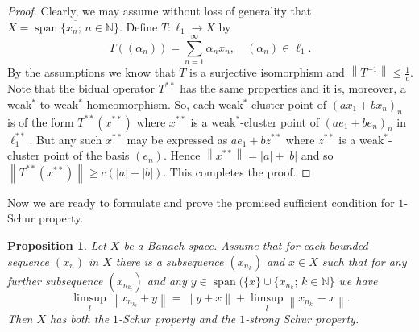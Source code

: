 \documentclass{amsart}
\numberwithin{equation}{section}
\newtheorem{prop}[thm]{Proposition}
\theoremstyle{definition}
\def\en{\mathbb N}
\def\ov{\overline}
\def\span{\operatorname{span}}
\newcommand{\norm}[1]{\left\|#1\right\|}
\newcommand{\abs}[1]{\left|#1\right|}
\newcommand{\setsep}{;\,}
\begin{document}
\begin{proof} Clearly, we may assume without loss of generality that $X=\ov{\span\{x_n\setsep n\in\en\}}$. Define $T:\ell_1\to X$ by
$$T((\alpha_n))=\sum_{n=1}^\infty \alpha_n x_n,\quad (\alpha_n)\in \ell_1.$$
By the assumptions we know that $T$ is a surjective isomorphism and $\norm{T^{-1}}\le \frac{1}{c}$. Note that the bidual operator $T^{**}$ has the same properties and it is, moreover, a weak$^*$-to-weak$^*$-homeomorphism. So, each weak$^*$-cluster point of $(ax_1+bx_n)_n$ is of the form
$T^{**}(x^{**})$ where $x^{**}$ is a weak$^*$-cluster point of $(ae_1+be_n)_n$ in $\ell_1^{**}$.
But any such $x^{**}$ may be expressed as $ae_1+bz^{**}$ where $z^{**}$ is a weak$^*$-cluster point of the basis $(e_n)$. Hence $\norm{x^{**}}=\abs{a}+\abs{b}$ and so $\norm{T^{**}(x^{**})}\ge c(\abs{a}+\abs{b})$.
This completes the proof.  
\end{proof}

Now we are ready to formulate and prove the promised sufficient condition for $1$-Schur property.
 
\begin{prop}\label{P:subs-1Schur}
    Let $X$ be a Banach space. Assume that for each bounded sequence $(x_n)$ in $X$ there is a subsequence $(x_{n_k})$ and $x\in X$ such that for any further subsequence $(x_{n_{k_l}})$ and any $y\in \span(\{x\}\cup\{x_{n_k}\setsep k\in\en\}$ we have
    $$\limsup_{l}\norm{x_{n_{k_l}}+y}=\norm{y+x}+\limsup_l
    \norm{x_{n_{k_l}}-x}.$$
    Then $X$ has both the $1$-Schur property and the $1$-strong Schur property.
\end{prop}
\end{document}
